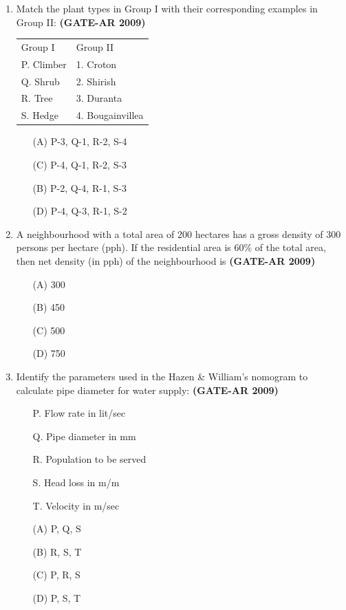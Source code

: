 \documentclass[a4paper,10pt]{article}
\begin{document}
\begin{enumerate}
	\item Match the plant types in Group I with their corresponding examples in Group II: \hfill \textbf{(GATE-AR 2009)} \\
    \begin{tabular}{ p p }
	Group I & Group II \\
	P. Climber & 1. Croton \\
	Q. Shrub & 2. Shirish \\
	R. Tree & 3. Duranta \\
	S. Hedge & 4. Bougainvillea \\
	\end{tabular}
	\begin{multicols}{2}
	\begin{itemize}
        \item[(A)] P-3, Q-1, R-2, S-4
        \item[(C)] P-4, Q-1, R-2, S-3
        \item[(B)] P-2, Q-4, R-1, S-3
        \item[(D)] P-4, Q-3, R-1, S-2
    \end{itemize}
	\end{multicols}

    \item A neighbourhood with a total area of 200 hectares has a gross density of 300 persons per hectare (pph). If the residential area is 60\% of the total area, then net density (in pph) of the neighbourhood is \hfill \textbf{(GATE-AR 2009)}
    \begin{multicols}{4}
	\begin{itemize}
        \item[(A)] 300
        \item[(B)] 450
        \item[(C)] 500
        \item[(D)] 750
    \end{itemize}
	\end{multicols}

    \item Identify the parameters used in the Hazen \& William’s nomogram to calculate pipe diameter for water supply: \hfill \textbf{(GATE-AR 2009)}
    \begin{itemize}
        \item[P.] Flow rate in lit/sec
        \item[Q.] Pipe diameter in mm
        \item[R.] Population to be served
        \item[S.] Head loss in m/m
        \item[T.] Velocity in m/sec
    \end{itemize}
    \begin{multicols}{4}
	\begin{itemize}
        \item[(A)] P, Q, S
        \item[(B)] R, S, T
        \item[(C)] P, R, S
        \item[(D)] P, S, T
    \end{itemize}
	\end{multicols}


\end{enumerate}
\end{document}
